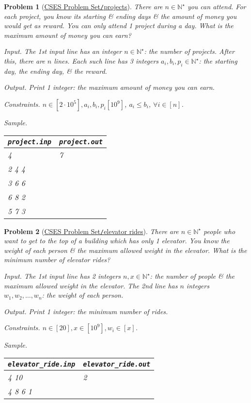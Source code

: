 \documentclass{article}
\newtheorem{problem}{Problem}
\begin{document}
\begin{problem}[\href{https://cses.fi/problemset/task/1140}{CSES Problem Set{\tt/}projects}]
	There are $n\in\mathbb{N}^\star$ you can attend. For each project, you know its starting \& ending days \& the amount of money you would get as reward. You can only attend 1 project during a day. What is the maximum amount of money you can earn?
	\item {\sf Input.} The 1st input line has an integer $n\in\mathbb{N}^\star$: the number of projects. After this, there are $n$ lines. Each such line has 3 integers $a_i,b_i,p_i\in\mathbb{N}^\star$: the starting day, the ending day, \& the reward.
	\item {\sf Output.} Print 1 integer: the maximum amount of money you can earn.
	\item {\sf Constraints.} $n\in[2\cdot10^5],a_i,b_i,p_i[10^9]$, $a_i\le b_i$, $\forall i\in[n]$.
	\item {\sf Sample.}
	\begin{table}[H]
		\centering
		\begin{tabular}{|l|l|}
			\hline
			\verb|project.inp| & \verb|project.out| \\
			\hline
			4 & 7 \\
			2 4 4 & \\
			3 6 6 & \\
			6 8 2 & \\
			5 7 3 & \\
			\hline
		\end{tabular}
	\end{table}
\end{problem}

\begin{problem}[\href{https://cses.fi/problemset/task/1653}{CSES Problem Set{\tt/}elevator rides}]
	There are $n\in\mathbb{N}^\star$ people who want to get to the top of a building which has only 1 elevator. You know the weight of each person \& the maximum allowed weight in the elevator. What is the minimum number of elevator rides?
	\item {\sf Input.} The 1st input line has 2 integers $n,x\in\mathbb{N}^\star$: the number of people \& the maximum allowed weight in the elevator. The 2nd line has $n$ integers $w_1,w_2,\ldots,w_n$: the weight of each person.
	\item {\sf Output.} Print 1 integer: the minimum number of rides.
	\item {\sf Constraints.} $n\in[20],x\in[10^9],w_i\in[x]$.
	\item {\sf Sample.}
	\begin{table}[H]
		\centering
		\begin{tabular}{|l|l|}
			\hline
			\verb|elevator_ride.inp| & \verb|elevator_ride.out| \\
			\hline
			4 10 & 2 \\
			4 8 6 1 & \\
			\hline
		\end{tabular}
	\end{table}
\end{problem}
\end{document}
